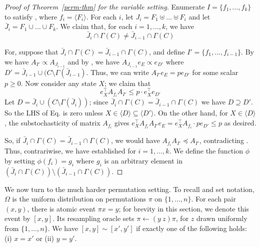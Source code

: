 \documentclass{toc}
\begin{document}
\begin{proof}[Proof of Theorem~\ref{perm-thm} for the variable setting]
Enumerate $I = \{ f_1, \dots, f_k \}$ to satisfy , where $f_i = \langle F_i \rangle$. For each $i$, let $J_i = F_1 \uplus \dots \uplus F_i$ and let $\bar J_i = F_1 \cup \dots \cup F_k$. We claim that, for each $i = 1, \dots, k$, we have
\begin{equation}
\label{zaz1eq}
\bar J_i \cap \Gamma(C) \neq \bar J_{i-1} \cap \Gamma(C)
\end{equation}


For, suppose that $\bar J_i \cap \Gamma(C) = \bar J_{i-1} \cap \Gamma(C)$, and define $I' = \{f_1, \dots, f_{i-1} \}$. By  we have $A_{I'} \propto A_{J_{i-1}}$ and by , we have $A_{J_{i-1}} e_E \propto e_{D'}$ where $D' =\bar J_{i-1} \cup (C \setminus \Gamma(\bar J_{i-1})$. Thus, we can write $A_{I'} e_E = p e_{D'}$ for some scalar  $p \geq 0$.  Now consider any state $X$; we claim that 
\begin{equation}
\label{zbz1eq}
e_{X}^{\top} A_{f_i} A_{I'} \leq p \cdot e_{X}^{\top} e_{D'}
\end{equation}
 Let $D = \bar J_i \cup (C \setminus \Gamma(\bar J_i))$; since $\bar J_i \cap \Gamma(C) = \bar J_{i-1} \cap \Gamma(C)$ we have $D \supseteq D'$. So the LHS of 
Eq.  %
 is zero unless $X \in \langle D \rangle \subseteq \langle D' \rangle$. On the other hand, for $X \in \langle D \rangle$, the substochasticity of matrix $A_{f_i}$ gives $  e_{X}^{\top} A_{f_i} A_{I'} e_E = e_{X}^{\top} A_{f_i} \cdot p e_{D'}  \leq p$  as desired.
  
  So, if $\bar J_i \cap \Gamma(C) = \bar J_{i-1} \cap \Gamma(C)$, we would have $  A_{f_i} A_{I'} \preceq A_{I'}$, contradicting .  Thus, contrariwise, we have established  for $i =1, \dots, k$. We define the function $\phi$ by setting $\phi( f_i ) = g_i$ where $g_i$ is an arbitrary element in $(\bar J_i \cap \Gamma(C)) \setminus (\bar J_{i-1} \cap \Gamma(C))$.
\end{proof}

\bigskip
We now turn to the much harder  permutation setting. To recall and set notation, $\Omega$ is the uniform distribution on permutations $\pi$ on $\{1, \dots, n \}$. For each pair $(x,y)$, there is atomic event $\pi x = y$; for brevity in this section, we denote this event by $[x, y]$. Its resampling oracle sets $\pi \leftarrow (y \ z) \pi$, for $z$ drawn uniformly from $\{1, \dots, n\}$. We have $[x,y] \sim [x', y']$ if exactly one of the following holds: (i) $x = x'$ or (ii) $y = y'$. 
\end{document}
